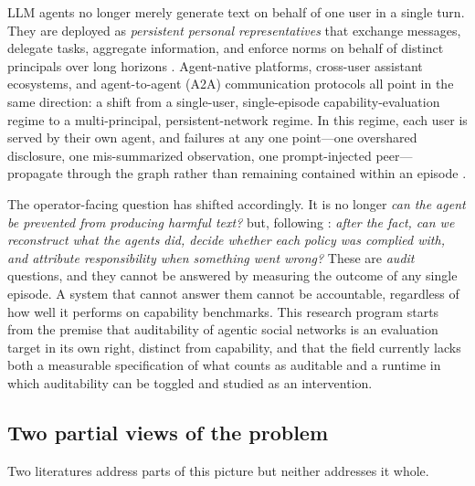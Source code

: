 \documentclass{article}
\begin{document}
LLM agents no longer merely generate text on behalf of one user in a single turn. They are deployed as \emph{persistent personal representatives} that exchange messages, delegate tasks, aggregate information, and enforce norms on behalf of distinct principals over long horizons \citep{wang2026agentsocialbench}. Agent-native platforms, cross-user assistant ecosystems, and agent-to-agent (A2A) communication protocols all point in the same direction: a shift from a single-user, single-episode capability-evaluation regime to a multi-principal, persistent-network regime. In this regime, each user is served by their own agent, and failures at any one point---one overshared disclosure, one mis-summarized observation, one prompt-injected peer---propagate through the graph rather than remaining contained within an episode \citep{wang2026agentsocialbench,park2023generative,oasis2024,piao2025agentsociety}.

The operator-facing question has shifted accordingly. It is no longer \emph{can the agent be prevented from producing harmful text?} but, following \citet{nian2026auditable}: \emph{after the fact, can we reconstruct what the agents did, decide whether each policy was complied with, and attribute responsibility when something went wrong?} These are \emph{audit} questions, and they cannot be answered by measuring the outcome of any single episode. A system that cannot answer them cannot be accountable, regardless of how well it performs on capability benchmarks. This research program starts from the premise that auditability of agentic social networks is an evaluation target in its own right, distinct from capability, and that the field currently lacks both a measurable specification of what counts as auditable and a runtime in which auditability can be toggled and studied as an intervention.

\subsection{Two partial views of the problem}
\label{sec:motivation:partial}

Two literatures address parts of this picture but neither addresses it whole.
\end{document}
